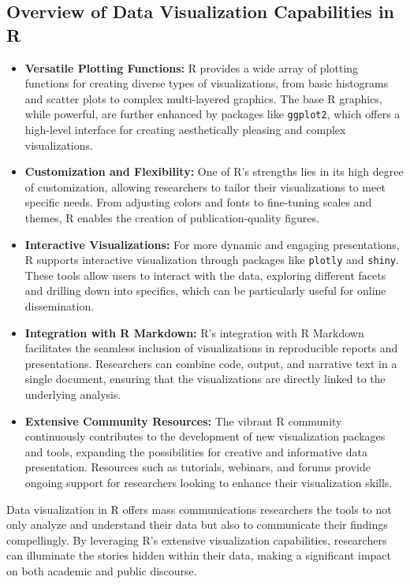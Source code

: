 \documentclass[
]{book}
\begin{document}
\hypertarget{overview-of-data-visualization-capabilities-in-r}{%
\subsection{Overview of Data Visualization Capabilities in R}\label{overview-of-data-visualization-capabilities-in-r}}

\begin{itemize}
\item
  \textbf{Versatile Plotting Functions:} R provides a wide array of plotting functions for creating diverse types of visualizations, from basic histograms and scatter plots to complex multi-layered graphics. The base R graphics, while powerful, are further enhanced by packages like \texttt{ggplot2}, which offers a high-level interface for creating aesthetically pleasing and complex visualizations.
\item
  \textbf{Customization and Flexibility:} One of R's strengths lies in its high degree of customization, allowing researchers to tailor their visualizations to meet specific needs. From adjusting colors and fonts to fine-tuning scales and themes, R enables the creation of publication-quality figures.
\item
  \textbf{Interactive Visualizations:} For more dynamic and engaging presentations, R supports interactive visualization through packages like \texttt{plotly} and \texttt{shiny}. These tools allow users to interact with the data, exploring different facets and drilling down into specifics, which can be particularly useful for online dissemination.
\item
  \textbf{Integration with R Markdown:} R's integration with R Markdown facilitates the seamless inclusion of visualizations in reproducible reports and presentations. Researchers can combine code, output, and narrative text in a single document, ensuring that the visualizations are directly linked to the underlying analysis.
\item
  \textbf{Extensive Community Resources:} The vibrant R community continuously contributes to the development of new visualization packages and tools, expanding the possibilities for creative and informative data presentation. Resources such as tutorials, webinars, and forums provide ongoing support for researchers looking to enhance their visualization skills.
\end{itemize}

Data visualization in R offers mass communications researchers the tools to not only analyze and understand their data but also to communicate their findings compellingly. By leveraging R's extensive visualization capabilities, researchers can illuminate the stories hidden within their data, making a significant impact on both academic and public discourse.
\end{document}
